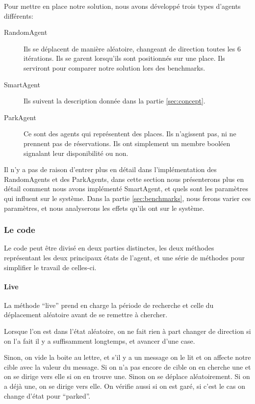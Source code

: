 Pour mettre en place notre solution, nous avons développé trois types
d'agents différents:

\begin{description}
\item[RandomAgent] Ils se déplacent de manière aléatoire, changeant de
  direction toutes les 6 itérations. Ils se garent lorsqu'ils sont
  positionnés sur une place. Ils serviront pour comparer notre
  solution lors des benchmarks.
\item[SmartAgent] Ils suivent la description donnée dans la partie
  \ref{sec:concept}.
\item[ParkAgent] Ce sont des agents qui représentent des places. Ils
  n'agissent pas, ni ne prennent pas de réservations. Ils ont
  simplement un membre booléen signalant leur disponibilité ou non.
\end{description}

Il n'y a pas de raison d'entrer plus en détail dans l'implémentation
des RandomAgents et des ParkAgents, dans cette section nous
présenterons plus en détail comment nous avons implémenté SmartAgent,
et quels sont les paramètres qui influent sur le système. Dans la
partie \ref{sec:benchmarks}, nous ferons varier ces paramètres, et
nous analyserons les effets qu'ils ont sur le système.

\subsubsection{Le code}
\label{sec:code}

Le code peut être divisé en deux parties distinctes, les deux méthodes
représentant les deux principaux états de l'agent, et une série de méthodes
pour simplifier le travail de celles-ci.

\paragraph{Live}

La méthode ``live'' prend en charge la période de recherche et celle
du déplacement aléatoire avant de se remettre à chercher.

Lorsque l'on est dans l'état aléatoire, on ne fait rien à part changer
de direction si on l'a fait il y a suffisamment longtemps, et avancer
d'une case.

Sinon, on vide la boite au lettre, et s'il y a un message on le lit et
on affecte notre cible avec la valeur du message. Si on n'a pas encore
de cible on en cherche une et on se dirige vers elle si on en trouve
une. Sinon on se déplace aléatoirement. Si on a déjà une, on se dirige
vers elle. On vérifie aussi si on est garé, si c'est le cas on change
d'état pour ``parked''.

